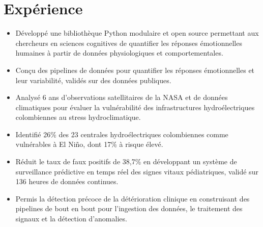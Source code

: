 
\section{Expérience}


\begin{itemize}[itemsep=1pt, topsep=1pt, leftmargin=15pt]

  \item Développé une bibliothèque Python modulaire et open source permettant aux chercheurs en sciences cognitives de quantifier les réponses émotionnelles humaines à partir de données physiologiques et comportementales.

  \item Conçu des pipelines de données pour quantifier les réponses émotionnelles et leur variabilité, validés sur des données publiques.
\end{itemize}

\vspace{4pt}


\begin{itemize}[itemsep=1pt, topsep=1pt, leftmargin=15pt]

  \item Analysé 6 ans d'observations satellitaires de la NASA et de données climatiques pour évaluer la vulnérabilité des infrastructures hydroélectriques colombiennes au stress hydroclimatique.

  \item Identifié 26\% des 23 centrales hydroélectriques colombiennes comme vulnérables à El Niño, dont 17\% à risque élevé.

\end{itemize}

\vspace{4pt}


\begin{itemize}[itemsep=1pt, topsep=1pt, leftmargin=15pt]

  \item Réduit le taux de faux positifs de 38,7\% en développant un système de surveillance prédictive en temps réel des signes vitaux pédiatriques, validé sur 136 heures de données continues.

  \item Permis la détection précoce de la détérioration clinique en construisant des pipelines de bout en bout pour l'ingestion des données, le traitement des signaux et la détection d'anomalies.

\end{itemize}

